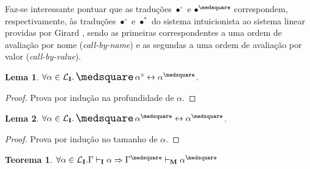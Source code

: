 \documentclass{report}
\newtheorem{lemma}{Lema}
\newtheorem{theorem}{Teorema}
\begin{document}
    Faz-se interessante pontuar que as traduções $\bullet^\circ$ e $\bullet^\medsquare$ correspondem, respectivamente, às traduções $\bullet^\circ$ e $\bullet^*$ do sistema intuicionista ao sistema linear providas por Girard \cite{Girard}, sendo as primeiras correspondentes a uma ordem de avaliação por nome (\textit{call-by-name}) e as segundas a uma ordem de avaliação por valor (\textit{call-by-value}). 

    \begin{lemma}
        $\forall \alpha \in \mathcal{L}_\mathbf{I} . \nec\alpha^\circ \leftrightarrow \alpha^\medsquare$.
    \end{lemma}

    \begin{proof}
        Prova por indução na profundidade de $\alpha$.
    \end{proof}

    \begin{lemma}
        $\forall \alpha \in \mathcal{L}_\mathbf{I} . \nec\alpha^\medsquare \leftrightarrow \alpha^\medsquare$.
    \end{lemma}

    \begin{proof}
        Prova por indução no tamanho de $\alpha$.
    \end{proof}

    \begin{theorem}
        $\forall \alpha \in \mathcal{L}_\mathbf{I} . \Gamma \vdash_\mathbf{I} \alpha \Rightarrow \Gamma^\medsquare \vdash_\mathbf{M} \alpha^\medsquare$
    \end{theorem}
\end{document}
